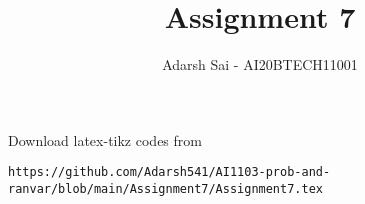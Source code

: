 \documentclass[journal,12pt,twocolumn]{IEEEtran}
\DeclareMathOperator*{\Res}{Res}
\begin{document}
\newcommand{\BEQA}{\begin{eqnarray}}
\newcommand{\EEQA}{\end{eqnarray}}
\newcommand{\define}{\stackrel{\triangle}{=}}

\raggedbottom
\setlength{\parindent}{0pt}
\providecommand{\mbf}{\mathbf}
\providecommand{\pr}[1]{\ensuremath{\Pr\left(#1\right)}}
\providecommand{\qfunc}[1]{\ensuremath{Q\left(#1\right)}}
\providecommand{\sbrak}[1]{\ensuremath{{}\left[#1\right]}}
\providecommand{\lsbrak}[1]{\ensuremath{{}\left[#1\right.}}
\providecommand{\rsbrak}[1]{\ensuremath{{}\left.#1\right]}}
\providecommand{\brak}[1]{\ensuremath{\left(#1\right)}}
\providecommand{\lbrak}[1]{\ensuremath{\left(#1\right.}}
\providecommand{\rbrak}[1]{\ensuremath{\left.#1\right)}}
\providecommand{\cbrak}[1]{\ensuremath{\left\{#1\right\}}}
\providecommand{\lcbrak}[1]{\ensuremath{\left\{#1\right.}}
\providecommand{\rcbrak}[1]{\ensuremath{\left.#1\right\}}}
\theoremstyle{remark}
\newtheorem{rem}{Remark}
\newcommand{\sgn}{\mathop{\mathrm{sgn}}}
\providecommand{\abs}[1]{\vert#1\vert}
\providecommand{\res}[1]{\Res\displaylimits_{#1}} 
\providecommand{\norm}[1]{\lVert#1\rVert}
\providecommand{\mtx}[1]{\mathbf{#1}}
\providecommand{\mean}[1]{E[ #1 ]}
\providecommand{\fourier}{\overset{\mathcal{F}}{ \rightleftharpoons}}
\providecommand{\system}{\overset{\mathcal{H}}{ \longleftrightarrow}}
\newcommand{\solution}{\noindent \textbf{Solution: }}
\newcommand{\cosec}{\,\text{cosec}\,}
\providecommand{\dec}[2]{\ensuremath{\overset{#1}{\underset{#2}{\gtrless}}}}
\newcommand{\myvec}[1]{\ensuremath{\begin{pmatrix}#1\end{pmatrix}}}
\newcommand{\mydet}[1]{\ensuremath{\begin{vmatrix}#1\end{vmatrix}}}
\makeatletter
{}
\makeatother
\let\StandardTheFigure\thefigure
\let\vec\mathbf
\renewcommand{\thefigure}{\theproblem}
\def\putbox#1#2#3{\makebox[0in][l]{\makebox[#1][l]{}\raisebox{\baselineskip}[0in][0in]{\raisebox{#2}[0in][0in]{#3}}}}
     \def\rightbox#1{\makebox[0in][r]{#1}}
     \def\centbox#1{\makebox[0in]{#1}}
     \def\topbox#1{\raisebox{-\baselineskip}[0in][0in]{#1}}
     \def\midbox#1{\raisebox{-0.5\baselineskip}[0in][0in]{#1}}
\vspace{3cm}
\title{Assignment 7}
\author{Adarsh Sai - AI20BTECH11001}
\maketitle
\newpage
\bigskip
\renewcommand{\thefigure}{\theenumi}
\renewcommand{\thetable}{\theenumi}
%
Download latex-tikz codes from 
%
\begin{lstlisting}
https://github.com/Adarsh541/AI1103-prob-and-ranvar/blob/main/Assignment7/Assignment7.tex
\end{lstlisting}
\end{document}
